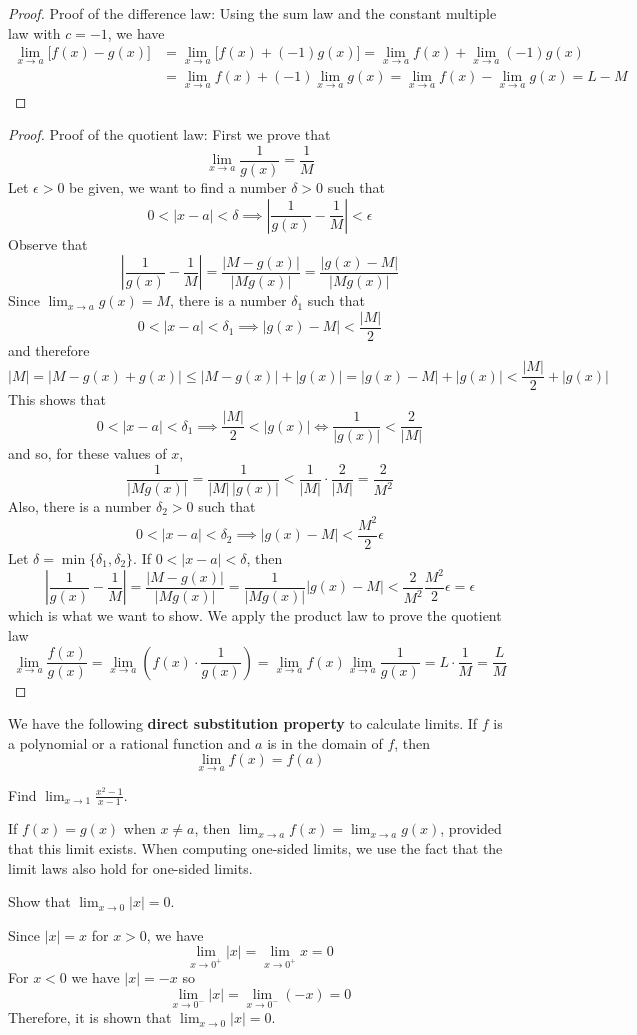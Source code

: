 \begin{proof}
    Proof of the difference law:
    Using the sum law and the constant multiple law with \(c=-1\),
    we have
    \begin{align*}
        \lim_{x\to a}\bigl[f(x)-g(x)\bigr]
        &= \lim_{x\to a}\bigl[f(x)+(-1)g(x)\bigr]
        =\lim_{x\to a}f(x)+\lim_{x\to a}(-1)g(x) \\
        &=\lim_{x\to a}f(x)+(-1)\lim_{x\to a}g(x)
        =\lim_{x\to a}f(x)-\lim_{x\to a}g(x)=L-M
    \end{align*}
\end{proof}
\begin{proof}
    Proof of the quotient law:
    First we prove that \[\lim_{x\to a}\frac{1}{g(x)}=\frac{1}{M}\]
    Let \(\epsilon>0\) be given,
    we want to find a number \(\delta>0\) such that
    \[0<|x-a|<\delta\implies\left|\frac{1}{g(x)}-\frac{1}{M}\right|<\epsilon\]
    Observe that \[\left|\frac{1}{g(x)}-\frac{1}{M}\right|
    =\frac{|M-g(x)|}{|Mg(x)|}=\frac{|g(x)-M|}{|Mg(x)|}\]
    Since \(\displaystyle{\lim_{x\to a}g(x)=M}\),
    there is a number \(\delta_1\) such that
    \[0<|x-a|<\delta_1\implies|g(x)-M|<\frac{|M|}{2}\] and therefore
    \[|M|=|M-g(x)+g(x)|\leq|M-g(x)|+|g(x)|=|g(x)-M|+|g(x)|
    <\frac{|M|}{2}+|g(x)|\]
    This shows that
    \[0<|x-a|<\delta_1\implies\frac{|M|}{2}<|g(x)|\iff\frac{1}{|g(x)|}
    <\frac{2}{|M|}\]
    and so,
    for these values of \(x\),
    \[\frac{1}{|Mg(x)|}=\frac{1}{|M|\,|g(x)|}<\frac{1}{|M|}\cdot\frac{2}{|M|}
    =\frac{2}{M^2}\]
    Also,
    there is a number \(\delta_2>0\) such that
    \[0<|x-a|<\delta_2\implies|g(x)-M|<\frac{M^2}{2}\epsilon\]
    Let \(\delta=\min\{\delta_1,\delta_2\}\).
    If \(0<|x-a|<\delta\),
    then
    \[\left|\frac{1}{g(x)}-\frac{1}{M}\right|=\frac{|M-g(x)|}{|Mg(x)|}
    =\frac{1}{|Mg(x)|}|g(x)-M|<\frac{2}{M^2}\frac{M^2}{2}\epsilon=\epsilon\]
    which is what we want to show.
    We apply the product law to prove the quotient law
    \[\lim_{x\to a}\frac{f(x)}{g(x)}
    =\lim_{x\to a}\left(f(x)\cdot\frac{1}{g(x)}\right)
    =\lim_{x\to a}f(x)\lim_{x\to a}\frac{1}{g(x)}=L\cdot\frac{1}{M}
    =\frac{L}{M}\]
\end{proof}
We have the following \textbf{direct substitution property} to calculate
limits.
If \(f\) is a polynomial or a rational function and \(a\) is in the domain of
\(f\),
then
\[\lim_{x\to a}f(x)=f(a)\]
\begin{problem}
    Find \(\displaystyle{\lim_{x\to 1}\frac{x^2-1}{x-1}}\).
\end{problem}
If \(f(x)=g(x)\) when \(x\neq a\),
then \(\displaystyle{\lim_{x\to a}f(x)=\lim_{x\to a}g(x)}\),
provided that this limit exists.
When computing one-sided limits,
we use the fact that the limit laws also hold for one-sided limits.
\begin{problem}
    Show that \(\displaystyle{\lim_{x\to 0}|x|=0}\).
\end{problem}
\begin{solution}
    Since \(|x|=x\) for \(x>0\),
    we have
    \[\lim_{x\to 0^+}|x|=\lim_{x\to 0^+}x=0\]
    For \(x<0\) we have \(|x|=-x\) so
    \[\lim_{x\to 0^-}|x|=\lim_{x\to 0^-}(-x)=0\]
    Therefore,
    it is shown that \(\displaystyle{\lim_{x\to 0}|x|=0}\).
\end{solution}

